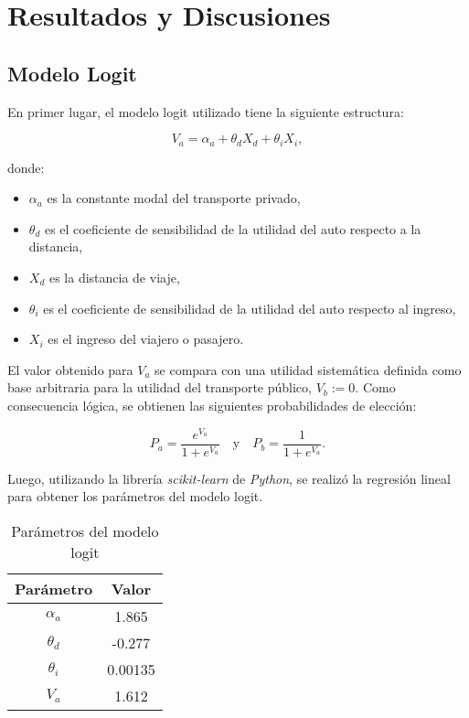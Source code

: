 \section{Resultados y Discusiones}

\subsection{Modelo Logit}

En primer lugar, el modelo logit utilizado tiene la siguiente estructura:

\begin{equation}
    V_a = \alpha_a + \theta_d X_d + \theta_i X_i,
\end{equation}

donde:
\begin{itemize}
    \item $\alpha_a$ es la constante modal del transporte privado,
    \item $\theta_d$ es el coeficiente de sensibilidad de la utilidad del auto respecto a la distancia,
    \item $X_d$ es la distancia de viaje,
    \item $\theta_i$ es el coeficiente de sensibilidad de la utilidad del auto respecto al ingreso,
    \item $X_i$ es el ingreso del viajero o pasajero.
\end{itemize}

El valor obtenido para \( V_a \) se compara con una utilidad sistemática definida como base arbitraria para la utilidad del transporte público, \( V_b := 0 \). Como consecuencia lógica, se obtienen las siguientes probabilidades de elección:

\begin{equation}
    P_a = \frac{e^{V_a}}{1+e^{V_a}} \quad \text{y} \quad P_b = \frac{1}{1+e^{V_a}}.
\end{equation} 

Luego, utilizando la librería \textit{scikit-learn} de \textit{Python}, se realizó la regresión lineal para obtener los parámetros del modelo logit.

\begin{table}[H]
    \centering
    \caption{Parámetros del modelo logit}
    \begin{tabular}{|c|c|}
    \hline
    Parámetro & Valor  \\ \hline
    $\alpha_{a}$    & 1.865     \\ \hline
    $\theta_{d}$    & -0.277     \\ \hline
    $\theta_{i}$    & 0.00135     \\ \hline
    $V_{a}$    & 1.612     \\ \hline
    \end{tabular}
    \label{tab:param}
\end{table}


